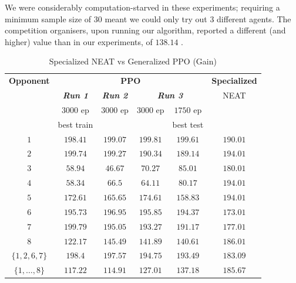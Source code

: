 \documentclass[conference]{IEEEtran}
\begin{document}
    We were considerably computation-starved in these experiments; requiring a minimum sample size of $30$ meant we could only try out $3$ different agents. The competition organisers, upon running our algorithm, reported a different (and higher) value than in our experiments, of $138.14$ \cite{evoman_competition_results}.

    \begin{table}[htbp]
        \caption{Specialized NEAT vs Generalized PPO (Gain)}
        \begin{center}
            \begin{tabular}{|c|c|c|c|c|c|}
                \hline
                \textbf{Opponent}&\multicolumn{4}{|c|}{\textbf{PPO}}&\textbf{Specialized} \\
                \cline{2-5}
                & \textbf{\textit{Run 1}}& \textbf{\textit{Run 2}}& \multicolumn{2}{|c|}{\textbf{\textit{Run 3}}} & NEAT \\
                \cline{4-5}
                & $3000$ ep & $3000$ ep & $3000$ ep & $1750$ ep & \\
                & best train & & & best test & \\
                \hline
                $1$ & $198.41$ & $199.07$ & $199.81$ & $199.61$ & $190.01$ \\
                $2$ & $199.74$ & $199.27$ & $190.34$ & $189.14$ & $194.01$ \\
                $3$ & $58.94$  & $46.67$  & $70.27$  & $85.01$  & $180.01$ \\
                $4$ & $58.34$  & $66.5$   & $64.11$  & $80.17$  & $194.01$ \\
                $5$ & $172.61$ & $165.65$ & $174.61$ & $158.83$ & $194.01$ \\
                $6$ & $195.73$ & $196.95$ & $195.85$ & $194.37$ & $173.01$ \\
                $7$ & $199.79$ & $195.05$ & $193.27$ & $191.17$ & $177.01$ \\
                $8$ & $122.17$ & $145.49$ & $141.89$ & $140.61$ & $186.01$ \\
                \hline
              $\{1, 2, 6, 7\}$ & $198.4$ & $197.57$ & $194.75$ & $193.49$ & $183.09$ \\
              \hline
              $\{1,\dots,8\}$  & $117.22$ & $114.91$ & $127.01$ & $137.18$ & $185.67$ \\
              \hline
            \end{tabular}
            \label{tab1}
        \end{center}
    \end{table}
\end{document}
